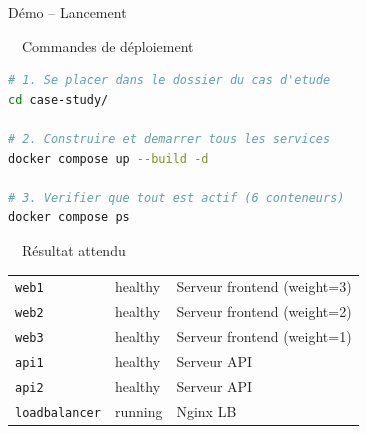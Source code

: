 \documentclass[aspectratio=169,12pt]{beamer}
\begin{document}
\begin{frame}[fragile]{Démo -- Lancement}
\begin{block}{\faTerminal\ \ Commandes de déploiement}
\begin{lstlisting}[language=bash]
# 1. Se placer dans le dossier du cas d'etude
cd case-study/

# 2. Construire et demarrer tous les services
docker compose up --build -d

# 3. Verifier que tout est actif (6 conteneurs)
docker compose ps
\end{lstlisting}
\end{block}

\vspace{0.3em}
\begin{exampleblock}{\faCheckCircle\ \ Résultat attendu}
\footnotesize
\begin{tabular}{lll}
\texttt{web1} & \textcolor{GreenOK}{healthy} & Serveur frontend (weight=3) \\
\texttt{web2} & \textcolor{GreenOK}{healthy} & Serveur frontend (weight=2) \\
\texttt{web3} & \textcolor{GreenOK}{healthy} & Serveur frontend (weight=1) \\
\texttt{api1} & \textcolor{GreenOK}{healthy} & Serveur API \\
\texttt{api2} & \textcolor{GreenOK}{healthy} & Serveur API \\
\texttt{loadbalancer} & \textcolor{GreenOK}{running} & Nginx LB \\
\end{tabular}
\end{exampleblock}
\end{frame}
\end{document}
